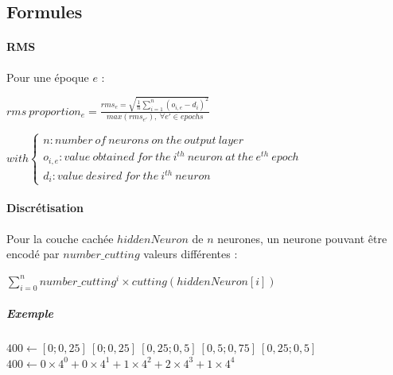 \documentclass[a4paper,12pt]{article}
\renewcommand{\sectionmark}[1]{\markright{#1}}
\begin{document}
    

    \newpage 
    \sectionmark{EXPÉRIENCE 1}
    \subsection*{Formules}
      \paragraph{RMS}
	Pour une époque $e$ :
	\begin{center}
	  \begin{large}
	  $ rms\ proportion_{e} = \frac{ rms_{e} = \sqrt{ \frac{1}{n} \sum \limits_{i=1}^{n} 
	  ( o_{i,e} - d_{i} )^2 }}{max(rms_{e'}),\ \forall e' \in epochs } $
	  \end{large}
	$ with \left\lbrace \begin{array}{lll} n : number\ of\ neurons\ on\ the\ output\ 
	layer\\o_{i,e} : value\ obtained\ for\ the\ i^{th}\ neuron\ at\ the\ e^{th}\ epoch\\d_{i} : 
	value\ desired \ for\ the\ i^{th}\ neuron\end{array} \right.$
	\end{center}
      \paragraph{Discrétisation} Pour la couche cachée $hiddenNeuron$ de $n$ neurones, un neurone
	pouvant être encodé par $number\_cutting$ valeurs différentes :
	\begin{center}
	 $\sum \limits_{i=0}^{n} number\_cutting^{i} \times cutting(hiddenNeuron[i]) $
	\end{center}
	\subparagraph{Exemple}
	  $400 \gets [0 ; 0,25 ]\ [0 ; 0,25 ]\  [0,25 ; 0,5 ]\  [0,5 ; 0,75 ]\  [0,25 ; 0,5 ]$ \\
	  \hspace*{2.70cm}
	  $400 \gets 0\times4^0 +   0\times4^1  +   1\times4^2   +  2\times4^3   +   1 \times4^4$
\end{document}
